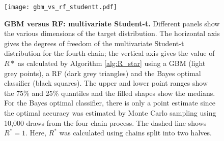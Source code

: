 \documentclass{article}
\begin{document}
\begin{figure}[!htb]
	\centerline{\texttt{[image: gbm\_vs\_rf\_studentt.pdf]}}
	\caption{\textbf{GBM versus RF: multivariate Student-t.} Different panels show the various dimensions of the target distribution. The horizontal axis gives the degrees of freedom of the multivariate Student-t distribution for the fourth chain; the vertical axis gives the value of $R*$ as calculated by Algorithm \ref{alg:R_star} using a GBM (light grey points), a RF (dark grey triangles) and the Bayes optimal classifier (black squares). The upper and lower point ranges show the 75\% and 25\% quantiles and the filled shapes show the medians. For the Bayes optimal classifier, there is only a point estimate since the optimal accuracy was estimated by Monte Carlo sampling using 10,000 draws from the four chain process. The dashed line shows $R^*=1$. Here, $R^*$ was calculated using chains split into two halves.}
	\label{fig:gbm_vs_rf_studdentt}
\end{figure}
\color{black}


 
\end{document}
